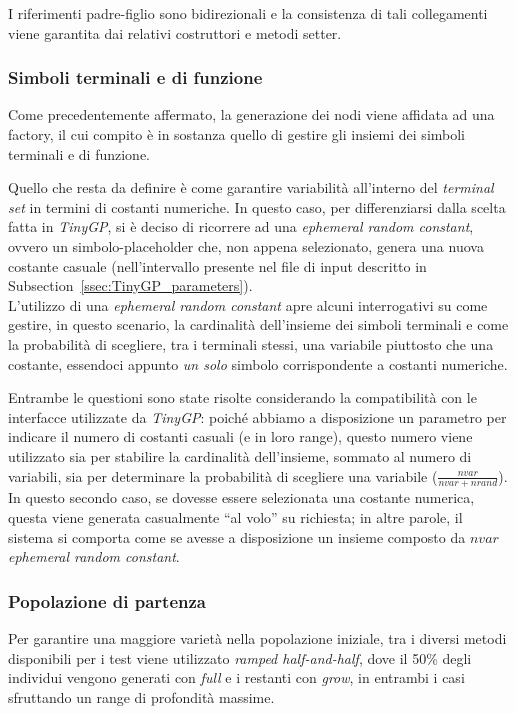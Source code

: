 \documentclass{../llncs}
\newcommand{\xss}[1]{\subsectionname~\ref{ssec:#1}}
\newcommand{\subsectionname}{Subsection}
\begin{document}
I riferimenti padre-figlio sono bidirezionali e la consistenza di tali collegamenti viene garantita dai relativi costruttori e metodi setter.

\subsubsection{Simboli terminali e di funzione}
Come precedentemente affermato, la generazione dei nodi viene affidata ad una factory, il cui compito è in sostanza quello di gestire gli insiemi dei simboli terminali e di funzione. %

Quello che resta da definire è come garantire variabilità all'interno del \emph{terminal set} in termini di costanti numeriche. In questo caso, per differenziarsi dalla scelta fatta in \emph{TinyGP}, si è deciso di ricorrere ad una \emph{ephemeral random constant}, ovvero un simbolo-placeholder che, non appena selezionato, genera una nuova costante casuale (nell'intervallo presente nel file di input descritto in \xss{TinyGP_parameters}).\\

L'utilizzo di una \emph{ephemeral random constant} apre alcuni interrogativi su come gestire, in questo scenario, la cardinalità dell'insieme dei simboli terminali e come la probabilità di scegliere, tra i terminali stessi, una variabile piuttosto che una costante, essendoci appunto \emph{un solo} simbolo corrispondente a costanti numeriche.

Entrambe le questioni sono state risolte considerando la compatibilità con le interfacce utilizzate da \emph{TinyGP}: poiché abbiamo a disposizione un parametro per indicare il numero di costanti casuali (e in loro range), questo numero viene utilizzato sia per stabilire la cardinalità dell'insieme, sommato al numero di variabili, sia per determinare la probabilità di scegliere una variabile ($\frac{nvar}{nvar+nrand}$). In questo secondo caso, se dovesse essere selezionata una costante numerica, questa viene generata casualmente ``al volo'' su richiesta; in altre parole, il sistema si comporta come se avesse a disposizione un insieme composto da $nvar$ \emph{ephemeral random constant}.

\subsubsection{Popolazione di partenza}
Per garantire una maggiore varietà nella popolazione iniziale, tra i diversi metodi disponibili per i test viene utilizzato \emph{ramped half-and-half}, dove il 50\% degli individui vengono generati con \emph{full} e i restanti con \emph{grow}, in entrambi i casi sfruttando un range di profondità massime.\\
\end{document}
